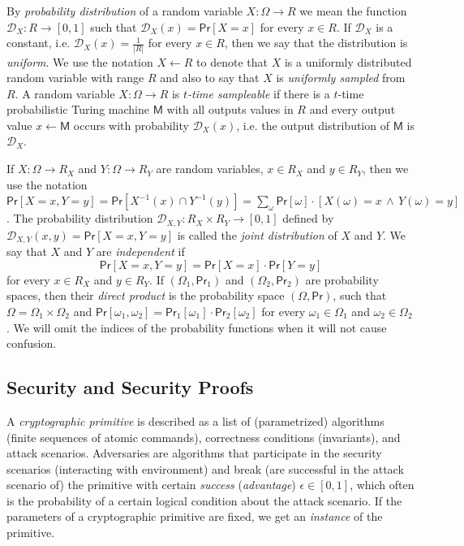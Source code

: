\documentclass{article}
\newcommand{\prob}[0]{\mathsf{Pr}} %
\begin{document}
By \emph{probability distribution} of a random variable $X\colon \Omega \rightarrow R$ we mean the function $\mathcal{D}_X\colon R\rightarrow [0,1]$ such that $\mathcal{D}_X(x)=\prob[X=x]$ for every $x\in R$.
If $\mathcal{D}_X$ is a constant, i.e.
$\mathcal{D}_X(x)=\frac{1}{|R|}$ for every $x\in R$, then we say that the distribution is \emph{uniform}.
We use the notation $X\gets R$ to denote that $X$ is a uniformly distributed random variable with range $R$ and also to say that $X$ is \emph{uniformly sampled} from $R$.
A random variable $X\colon \Omega \rightarrow R$ is \emph{$t$-time sampleable} if there is a $t$-time probabilistic Turing machine $\mathsf{M}$
with all outputs values in $R$ and every output value $x\gets \mathsf{M}$ occurs with probability $\mathcal{D}_X(x)$, i.e. the output distribution of
$\mathsf{M}$ is $\mathcal{D}_X$.


If $X\colon \Omega\rightarrow R_X$ and $Y\colon \Omega\rightarrow R_Y$ are
random variables, $x\in R_X$ and $y\in R_Y$, then we use the notation
$\prob[X=x, Y=y] = \prob[X^{-1}(x)\cap Y^{-1}(y)]=\sum_\omega \prob[\omega]\cdot[X(\omega)=x\,\wedge\, Y(\omega)=y]$.
The probability distribution $\mathcal{D}_{X,Y}\colon R_X \times R_Y\rightarrow [0,1]$ defined by $\mathcal{D}_{X,Y}(x,y)= \prob[X=x, Y=y]$ is called the \emph{joint distribution} of $X$ and $Y$.
We say that $X$ and $Y$ are \emph{independent} if
\[
\prob[X=x,Y=y]=\prob[X=x]\cdot\prob[Y=y]
\]
for every $x\in R_X$ and $y\in R_Y$.
If $(\Omega_1,\prob_1)$ and $(\Omega_2,\prob_2)$ are probability spaces, then their \emph{direct product} is the probability space $(\Omega, \prob)$, such that $\Omega = \Omega_1 \times \Omega_2$ and $\prob[\omega_1,\omega_2]=\prob_1[\omega_1]\cdot \prob_2[\omega_2]$ for every $\omega_1\in\Omega_1$ and $\omega_2\in\Omega_2$. We will omit the indices of the probability functions when it will not cause confusion.

\subsection{Security and Security Proofs}

A \emph{cryptographic primitive} is described as a list of (parametrized) algorithms (finite sequences of atomic commands), correctness conditions (invariants), and attack scenarios. Adversaries are algorithms that participate in the security scenarios (interacting with environment) and break (are successful in the attack scenario of) the primitive with certain \emph{success} (\emph{advantage}) $\epsilon\in[0,1]$, which often is the probability of a certain logical condition about the attack scenario.
If the parameters of a cryptographic primitive are fixed, we get an \emph{instance} of the primitive.
\end{document}
